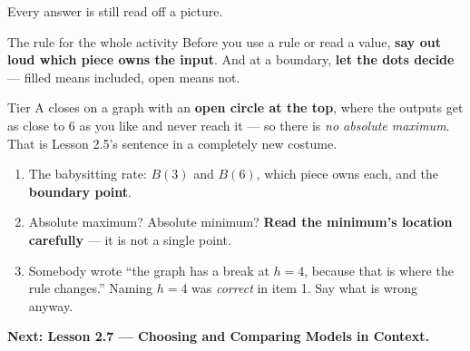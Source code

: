 \documentclass[aspectratio=169, 11pt]{beamer}
\begin{document}
\begin{frame}[t, plain]
  Every answer is still read off a picture.
  \begin{block}{The rule for the whole activity}
    Before you use a rule or read a value, \textbf{say out loud which piece owns the input}. And at
    a boundary, \textbf{let the dots decide} --- filled means included, open means not.
  \end{block}
  \vspace{0.1cm}
  Tier A closes on a graph with an \textbf{open circle at the top}, where the outputs get as close to
  $6$ as you like and never reach it --- so there is \emph{no absolute maximum}. That is Lesson 2.5's
  sentence in a completely new costume.
\end{frame}

\begin{frame}[t, plain]
  \begin{enumerate}
    \setlength{\itemsep}{0.3cm}
    \item The babysitting rate: $B(3)$ and $B(6)$, which piece owns each, and the \textbf{boundary
          point}.
    \item Absolute maximum? Absolute minimum? \textbf{Read the minimum's location carefully} --- it
          is not a single point.
    \item Somebody wrote ``the graph has a break at $h=4$, because that is where the rule changes.''
          Naming $h=4$ was \emph{correct} in item 1. Say what is wrong anyway.
  \end{enumerate}
  \vspace{0.2cm}
  {\color{royal}\bfseries Next: Lesson 2.7 --- Choosing and Comparing Models in Context.}
\end{frame}
\end{document}
